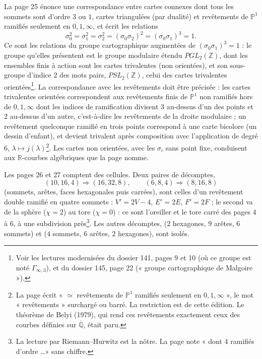 \documentclass[11pt,a4paper]{article}
\begin{document}
La page 25 énonce une correspondance entre cartes connexes dont tous les sommets
sont d'ordre $3$ ou $1$, cartes triangulées (par dualité) et revêtements de
$\mathbb{P}^{1}$ ramifiés seulement en $0, 1, \infty$, et écrit les relations
\[
\sigma_0^2 = \sigma_1^2 = \sigma_2^2 = (\sigma_0\sigma_2)^2 = (\sigma_0\sigma_1)^3 = 1 .
\]
Ce sont les relations du groupe cartographique augmentées de $(\sigma_0\sigma_1)^3
= 1$ : le groupe qu'elles présentent est le groupe modulaire étendu
$PGL_2(\mathbb{Z})$, dont les ensembles finis à action sont les cartes
trivalentes (non orientées), et son sous-groupe d'indice $2$ des mots pairs,
$PSL_2(\mathbb{Z})$, celui des cartes trivalentes orientées\footnote{Voir les
lectures modernisées du dossier 141, pages 9 et 10 (où ce groupe est noté
$\Gamma_{\infty,3}$), et du dossier 145, page 22 (« groupe cartographique de
Malgoire »).}. La correspondance avec les revêtements doit être précisée : les
cartes trivalentes orientées correspondent aux revêtements finis de
$\mathbb{P}^{1}$ non ramifiés hors de $0, 1, \infty$ dont les indices de
ramification divisent $3$ au-dessus d'un des points et $2$ au-dessus d'un autre,
c'est-à-dire les revêtements de la droite modulaire ; un revêtement quelconque ramifié en
trois points correspond à une carte bicolore (un dessin d'enfant), et devient
trivalent après composition avec l'application de degré $6$, $\lambda \mapsto
j(\lambda)$\footnote{La page écrit « $\simeq$ revêtements de $\mathbb{P}^{1}$
ramifiés seulement en $0, 1, \infty$ », le mot « revêtements » surchargé ou
barré. La restriction est de cette édition. Le théorème de Belyi (1979), qui
rend ces revêtements exactement ceux des courbes définies sur
$\overline{\mathbb{Q}}$, était paru.}. Les cartes non orientées, avec les
$\sigma_i$ sans point fixe, conduisent aux $\mathbb{R}$-courbes algébriques que
la page nomme.

Les pages 26 et 27 comptent des cellules. Deux paires de décomptes,
\[
(10, 16, 4) \Longrightarrow (16, 32, 8), \qquad (6, 8, 4) \Longrightarrow (8,
16, 8)
\]
(sommets, arêtes, faces hexagonales puis carrées), sont celles d'un revêtement
double ramifié en quatre sommets : $V' = 2V - 4$, $E' = 2E$, $F' = 2F$ ; le
second va de la sphère ($\chi = 2$) au tore ($\chi = 0$) : ce sont l'oreiller et le tore
carré des pages 4 à 6, à une subdivision près\footnote{La lecture par
Riemann–Hurwitz est la nôtre. La page note « dont 4 ramifiés d'ordre \ldots »
sans chiffre.}. Les autres décomptes, ($2$ hexagones, $9$ arêtes, $6$ sommets)
et ($4$ sommets, $6$ arêtes, $2$ hexagones), sont isolés.
\end{document}
